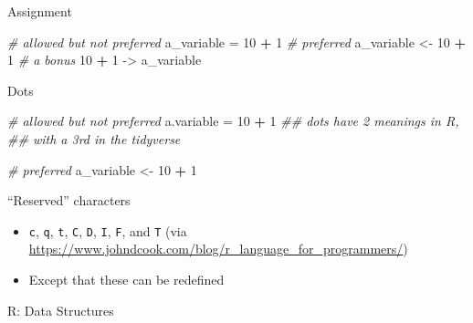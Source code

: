 \documentclass[
  ignorenonframetext,
]{beamer}
\newenvironment{Shaded}{\begin{snugshade}}{\end{snugshade}}
\newcommand{\CommentTok}[1]{\textcolor[rgb]{0.56,0.35,0.01}{\textit{#1}}}
\newcommand{\DecValTok}[1]{\textcolor[rgb]{0.00,0.00,0.81}{#1}}
\newcommand{\NormalTok}[1]{#1}
\newcommand{\OperatorTok}[1]{\textcolor[rgb]{0.81,0.36,0.00}{\textbf{#1}}}
\newcommand{\StringTok}[1]{\textcolor[rgb]{0.31,0.60,0.02}{#1}}
\providecommand{\tightlist}{%
  \setlength{\itemsep}{0pt}\setlength{\parskip}{0pt}}
\begin{document}
\begin{frame}[fragile]{Assignment}
\protect\hypertarget{assignment}{}

\begin{Shaded}
\begin{Highlighting}[]
\CommentTok{# allowed but not preferred}
\NormalTok{a_variable =}\StringTok{ }\DecValTok{10} \OperatorTok{+}\StringTok{ }\DecValTok{1}
\CommentTok{# preferred}
\NormalTok{a_variable <-}\StringTok{ }\DecValTok{10} \OperatorTok{+}\StringTok{ }\DecValTok{1}
\CommentTok{# a bonus}
\DecValTok{10} \OperatorTok{+}\StringTok{ }\DecValTok{1}\NormalTok{ ->}\StringTok{ }\NormalTok{a_variable}
\end{Highlighting}
\end{Shaded}

\end{frame}

\begin{frame}[fragile]{Dots}
\protect\hypertarget{dots}{}

\begin{Shaded}
\begin{Highlighting}[]
\CommentTok{# allowed but not preferred}
\NormalTok{a.variable =}\StringTok{ }\DecValTok{10} \OperatorTok{+}\StringTok{ }\DecValTok{1}
  \CommentTok{## dots have 2 meanings in R, }
    \CommentTok{## with a 3rd in the tidyverse}

\CommentTok{# preferred}
\NormalTok{a_variable <-}\StringTok{ }\DecValTok{10} \OperatorTok{+}\StringTok{ }\DecValTok{1}
\end{Highlighting}
\end{Shaded}

\end{frame}

\begin{frame}[fragile]{``Reserved'' characters}
\protect\hypertarget{reserved-characters}{}

\begin{itemize}[<+->]
\tightlist
\item
  \texttt{c}, \texttt{q}, \texttt{t}, \texttt{C}, \texttt{D},
  \texttt{I}, \texttt{F}, and \texttt{T} (via
  \url{https://www.johndcook.com/blog/r_language_for_programmers/})
\item
  Except that these can be redefined
\end{itemize}

\end{frame}

\begin{frame}{R: Data Structures}
\protect\hypertarget{r-data-structures}{}

\end{frame}
\end{document}
